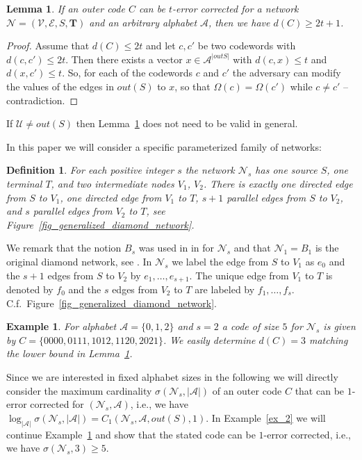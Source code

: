\documentclass[11pt]{article}
\newcommand{\cA}{\mathcal{A}}
\newcommand{\cE}{\mathcal{E}}
\newcommand{\cN}{\mathcal{N}}
\newcommand{\cU}{\mathcal{U}}
\newcommand{\cV}{\mathcal{V}}
\newtheorem{lemma}[theorem]{Lemma}
\newtheorem{definition}[theorem]{Definition}
\newtheorem{example}[theorem]{Example}
\begin{document}
\begin{lemma}
  \label{lemma_min_dist}
  If an outer code $C$ can be $t$-error corrected for a network $\cN=(\cV,\cE,S,\mathbf{T})$ and an arbitrary alphabet $\cA$, then we have $d(C)\ge 2t+1$. 
\end{lemma}
\begin{proof}
  Assume that $d(C)\le 2t$ and let $c,c'$ be two codewords with $d(c,c')\le 2t$. Then there exists a vector $x\in \cA^{|out{S}|}$ with $d(c,x)\le t$ and $d(x,c')\le t$. 
  So, for each of the codewords $c$ and $c'$ the adversary can modify the values of the edges in $out(S)$ to $x$, so that $\Omega(c)=\Omega(c')$ while $c\neq c'$ -- 
  contradiction.  
\end{proof}
If $\cU\neq out(S)$ then Lemma~\ref{lemma_min_dist} does not need to be valid in general.

In this paper we will consider a specific parameterized family of networks:
\begin{definition}
  \label{def_family_B}
  For each positive integer $s$ the network $\cN_s$ has one source $S$, one terminal 
  $T$, and two intermediate nodes $V_1$, $V_2$. There is exactly one directed edge from $S$ to $V_1$, one directed 
  edge from $V_1$ to $T$, $s+1$ parallel edges from $S$ to $V_2$, and $s$ parallel edges from $V_2$ to $T$,
  see Figure~\ref{fig_generalized_diamond_network}.  
\end{definition}

We remark that the notion $B_s$ was used in in \cite{beemer2022network_arxiv} for $\cN_s$ and that $\cN_1=B_1$ is the 
original diamond network, see \cite{beemer2021curious}. In $\cN_s$ we label the edge from $S$ to $V_1$ as $e_0$ and the $s+1$ edges from $S$ to $V_2$ by $e_1,\dots,e_{s+1}$. 
The unique edge from $V_1$ to $T$ is denoted by $f_0$ and the $s$ edges from $V_2$ to $T$ are labeled by $f_1,\dots, f_s$. 
C.f.~Figure~\ref{fig_generalized_diamond_network}. 

\begin{example}
  \label{ex_1}
  For alphabet $\cA=\{0,1,2\}$ and $s=2$ a code of size $5$ for $\cN_s$ is given by $C=\{0 0 0 0,0 1 1 1, 1 0 1 2,1 1 2 0,2 0 2 1\}$. We easily determine 
  $d(C)=3$ matching the lower bound in Lemma~\ref{lemma_min_dist}.
\end{example}

Since we are interested in fixed alphabet sizes in the following we will directly consider the maximum cardinality $\sigma(\cN_s,|\cA|)$ of an outer code 
$C$ that can be $1$-error corrected for $\left(\cN_s,\cA\right)$, i.e., we have $\log_{|\cA|} \sigma(\cN_s,|\cA|)=C_1(\cN_s,\cA,out(S),1)$. In Example~\ref{ex_2} we will 
continue Example~\ref{ex_1} and show that the stated code can be $1$-error corrected, i.e., we have $\sigma(\cN_s,3)\ge 5$. 
\end{document}
